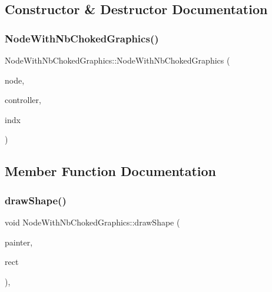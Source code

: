 \subsection{Constructor \& Destructor Documentation}
\mbox{\label{class_node_with_nb_choked_graphics_a83407d5fab4b0431154708fcb008078f}} 
\subsubsection{\texorpdfstring{NodeWithNbChokedGraphics()}{NodeWithNbChokedGraphics()}}
{\footnotesize\ttfamily Node\+With\+Nb\+Choked\+Graphics\+::\+Node\+With\+Nb\+Choked\+Graphics (\begin{DoxyParamCaption}\item[{\mbox{\hyperlink{class_node_data}{Node\+Data}} $\ast$}]{node,  }\item[{\mbox{\hyperlink{class_map_objects_controller}{Map\+Objects\+Controller}} $\ast$}]{controller,  }\item[{int}]{indx }\end{DoxyParamCaption})\hspace{0.3cm}{\ttfamily [inline]}}



\subsection{Member Function Documentation}
\mbox{\label{class_node_with_nb_choked_graphics_aebe997d9fe4273c85dcbd24272658a0c}} 
\subsubsection{\texorpdfstring{drawShape()}{drawShape()}}
{\footnotesize\ttfamily void Node\+With\+Nb\+Choked\+Graphics\+::draw\+Shape (\begin{DoxyParamCaption}\item[{Q\+Painter \&}]{painter,  }\item[{const qmapcontrol\+::\+Rect\+World\+Px \&}]{rect }\end{DoxyParamCaption})\hspace{0.3cm}{\ttfamily [protected]}, {\ttfamily [virtual]}}



